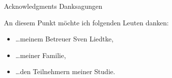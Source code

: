 \makeatletter
{}
{}
{}
\makeatother
\thispagestyle{empty}

\vspace*{20mm}

\begin{center}
\makeatletter
{}
{ Acknowledgments}
{ Danksagungen}
\makeatother
\end{center}

\vspace{10mm}

An diesem Punkt möchte ich folgenden Leuten danken:
\begin{itemize}
	\item \dots meinem Betreuer Sven Liedtke, 
	\item \dots meiner Familie, 
	\item \dots den Teilnehmern meiner Studie. 
\end{itemize}

\cleardoublepage{}

